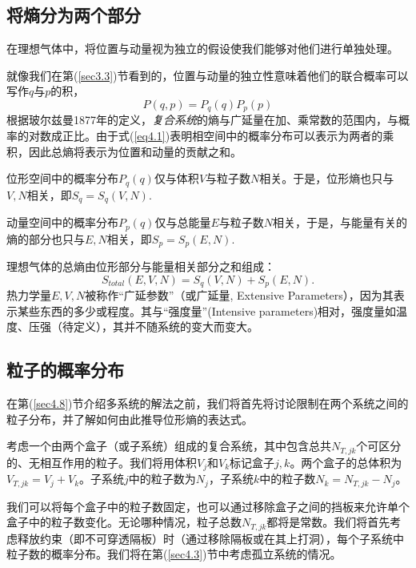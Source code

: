 \documentclass[UTF8]{ctexart}
\numberwithin{equation}{section}%
\numberwithin{figure}{section}%
\begin{document}
    \subsection{将熵分为两个部分}\label{sec4.1}

    在理想气体中，将位置与动量视为独立的假设使我们能够对他们进行单独处理。

    就像我们在第(\ref{sec3.3})节看到的，位置与动量的独立性意味着他们的联合概率可以写作$q$与$p$的积，
    \begin{equation}\label{eq4.1}
        P(q, p)=P_{q}(q) P_{p}(p)
    \end{equation}
    根据玻尔兹曼1877年的定义，\textit{复合系统}的熵与广延量在加、乘常数的范围内，与概率的对数成正比。由于式(\ref{eq4.1})表明相空间中的概率分布可以表示为两者的乘积，因此总熵将表示为位置和动量的贡献之和。
    
    位形空间中的概率分布$P_q(q)$仅与体积$V$与粒子数$N$相关。于是，位形熵也只与$V,N$相关，即$S_q=S_q(V,N)$.

    动量空间中的概率分布$P_p(q)$仅与总能量$E$与粒子数$N$相关，于是，与能量有关的熵的部分也只与$E,N$相关，即$S_p=S_p(E,N)$.

    理想气体的总熵由位形部分与能量相关部分之和组成：
    \begin{equation}
        S_{total}(E, V, N)=S_{q}(V, N)+S_{p}(E, N).
    \end{equation}
    热力学量$E,V,N$被称作“广延参数”（或广延量, Extensive Parameters），因为其表示某些东西的多少或程度。其与“强度量”(Intensive parameters)相对，强度量如温度、压强（待定义），其并不随系统的变大而变大。
    \subsection{粒子的概率分布}
    在第(\ref{sec4.8})节介绍多系统的解法之前，我们将首先将讨论限制在两个系统之间的粒子分布，并了解如何由此推导位形熵的表达式。

    考虑一个由两个盒子（或子系统）组成的复合系统，其中包含总共$N_{T,jk}$个可区分的、无相互作用的粒子。我们将用体积$V_j$和$V_k$标记盒子$j,k$。两个盒子的总体积为$V_{T,jk}=V_j+V_k$。子系统$j$中的粒子数为$N_j$，子系统$k$中的粒子数$N_k=N_{T,jk}-N_j$。

    我们可以将每个盒子中的粒子数固定，也可以通过移除盒子之间的挡板来允许单个盒子中的粒子数变化。无论哪种情况，粒子总数$N_{T,jk}$都将是常数。我们将首先考虑释放约束（即不可穿透隔板）时（通过移除隔板或在其上打洞），每个子系统中粒子数的概率分布。我们将在第(\ref{sec4.3})节中考虑孤立系统的情况。
    
\end{document}
